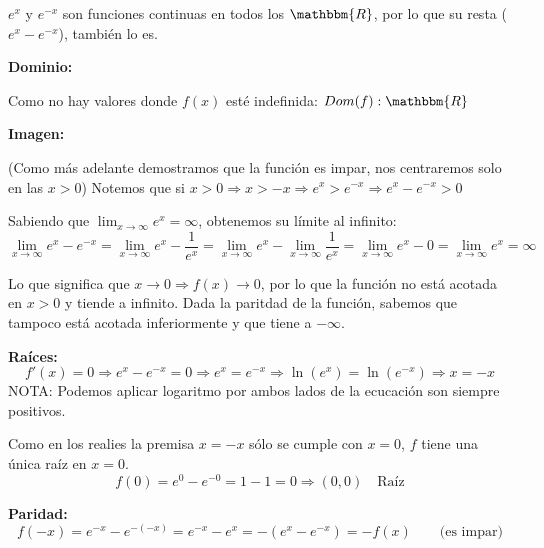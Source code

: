 \documentclass[12pt]{article}
\begin{document}
\begin{enumerate}[\hspace{9px} a)]
            \(e^x\) y \(e^{-x}\) son funciones continuas en todos los \(\mathbbm{R}\), por lo que su resta (\(e^x-e^{-x}\)), tambi\'en lo es.\medskip

        \textbf{Dominio: }\medskip

            Como no hay valores donde $f(x)$ est\'e indefinida: \(Dom(f):\mathbbm{R}\)\medskip

        \textbf{Imagen: }\medskip

            (Como m\'as adelante demostramos que la funci\'on es impar, nos centraremos solo en las \(x>0\)) Notemos que si \(x>0 \Rightarrow x>-x \Rightarrow e^x>e^{-x} \Rightarrow e^x-e^{-x}>0\)\medskip

            Sabiendo que \(\lim_{x\to\infty}e^x=\infty\), obtenemos su l\'imite al infinito:
            \begin{equation*}
                \lim_{x\to\infty}e^x-e^{-x}=\lim_{x\to\infty}e^x-\frac{1}{e^x}=\lim_{x\to\infty}e^x-\lim_{x\to\infty}\frac{1}{e^x} = \lim_{x\to\infty}e^x-0=\lim_{x\to\infty}e^x=\infty
            \end{equation*}

            Lo que significa que \(x\to0 \Rightarrow f(x)\to0\), por lo que la funci\'on no est\'a acotada en \(x>0\) y tiende a infinito. Dada la paritdad de la funci\'on, sabemos que tampoco est\'a acotada inferiormente y que tiene a \(-\infty\).\medskip

        \textbf{Ra\'ices: }
            \begin{equation*}
                f'(x)=0 \Rightarrow e^x-e^{-x}=0 \Rightarrow e^x=e^{-x} \Rightarrow \ln(e^x)=\ln(e^{-x}) \Rightarrow x=-x
            \end{equation*}
            NOTA: Podemos aplicar logaritmo por ambos lados de la ecucaci\'on son siempre positivos.\medskip

            Como en los realies la premisa \(x = -x\) s\'olo se cumple con \(x=0\), \(f\) tiene una \'unica ra\'iz en \(x=0\).
            \begin{equation*}
                f(0)=e^0-e^{-0}=1-1=0 \Longrightarrow (0,0) \quad \text{Raíz}
            \end{equation*}

        \textbf{Paridad: }
            \begin{equation*}
                f(-x) = e^{-x}-e^{-(-x)} = e^{-x}-e^{x} = -(e^x-e^{-x}) = -f(x) \qquad \text{(es impar)}
            \end{equation*}


\end{enumerate}
\end{document}
